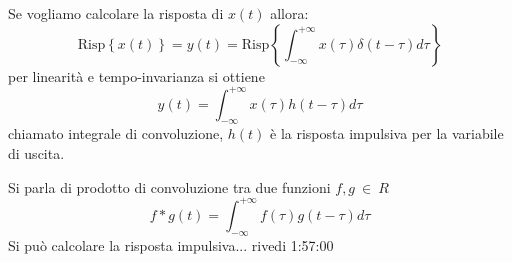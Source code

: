 Se vogliamo calcolare la risposta di $x(t)$ allora:
$$
\text{Risp}\left\{x(t)\right\} = y(t) = \text{Risp} \left\{\int_{-\infty}^{+\infty} x(\tau)\delta(t-\tau)
d\tau\right\}
$$
per linearità e tempo-invarianza si ottiene
$$
y(t) = \int_{-\infty}^{+\infty} x(\tau)h(t-\tau) d\tau
$$
chiamato integrale di convoluzione, $h(t)$ è la risposta impulsiva per la variabile di uscita.

Si parla di prodotto di convoluzione tra due funzioni $f,g \ \in\ R$
$$
f * g(t) = \int_{-\infty}^{+\infty} f(\tau)g(t-\tau)d\tau
$$
Si può calcolare la risposta impulsiva... rivedi 1:57:00
